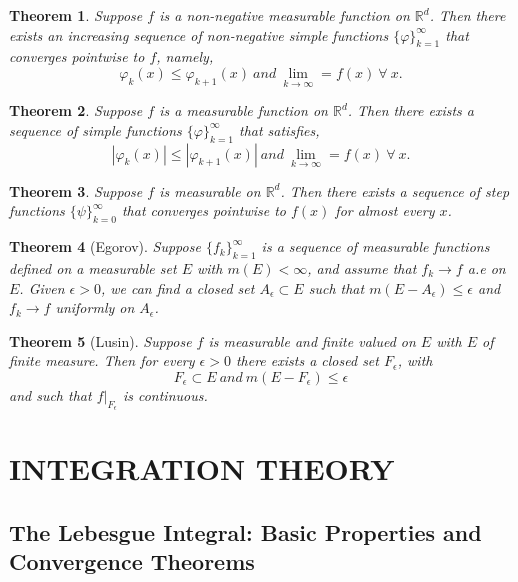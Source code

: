 \documentclass{report}
\theoremstyle{upthm}
\newtheorem{thm}{Theorem}
\newcommand{\reals}{\mathbb{R}}
\newcommand{\set}[1]{\big\lbrace #1 \big\rbrace}
\begin{document}
\begin{thm}
	Suppose $f$ is a non-negative measurable function on $\reals^d$. Then there exists an increasing sequence of non-negative simple functions $\set{\varphi}_{k=1}^{\infty} $ that converges pointwise to $f$, namely,
	$$ \varphi_k (x) \leq \varphi_{k+1} (x)\ and\ \lim_{k \rightarrow \infty} = f(x)\ \forall\ x.$$
\end{thm}

\begin{thm}
	Suppose $f$ is a measurable function on $\reals^d$. Then there exists a sequence of simple functions $\set{\varphi}_{k=1}^{\infty} $ that satisfies,
	$$ |\varphi_k (x)| \leq |\varphi_{k+1} (x)| \ and\ \lim_{k \rightarrow \infty} = f(x)\ \forall\ x.$$
\end{thm}

\begin{thm}
	Suppose $f$ is measurable on $\reals^d$. Then there exists a sequence of step functions $\set{\psi}_{k=0}^\infty$ that converges pointwise to $f(x)$ for almost every $x$.
\end{thm}

\begin{thm}[Egorov]
	Suppose $\set{f_k}_{k=1}^\infty$ is a sequence of measurable functions defined on a measurable set $E$ with $m(E) < \infty $, and assume that $f_k \rightarrow f$ a.e on $E$. Given $\epsilon > 0 $, we can find a closed set $A_\epsilon \subset E$ such that $m(E - A_\epsilon) \leq \epsilon$ and $f_k \rightarrow f$ uniformly on $A_\epsilon$.
\end{thm}

\begin{thm}[Lusin]
	Suppose $f$ is measurable and finite valued on $E$ with $E$ of finite measure. Then for every $\epsilon > 0$ there exists a closed set $F_\epsilon$, with
	$$F_\epsilon \subset E\ and\ m(E - F_\epsilon) \leq \epsilon$$
	and such that $f|_{F_\epsilon}$ is continuous.
\end{thm}



\chapter{INTEGRATION THEORY}

\section{The Lebesgue Integral: Basic Properties and Convergence Theorems}
\end{document}
